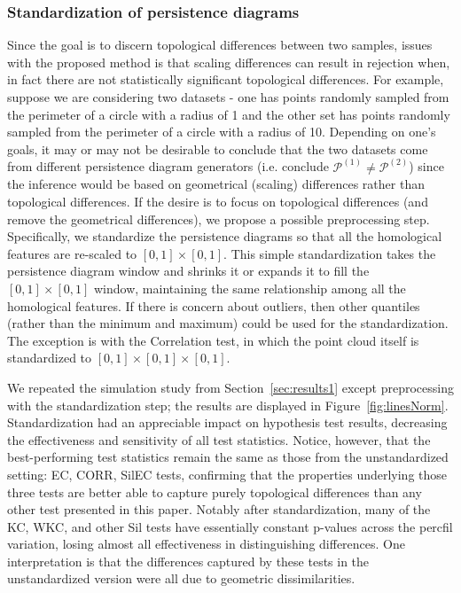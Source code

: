 \documentclass[12pt]{article}
\newcommand{\figref}[1]{Figure~\ref{#1}}
\begin{document}
\subsubsection{Standardization of persistence diagrams} \label{sec:standardize}
Since the goal is to discern topological differences between two samples, issues with the proposed method is that scaling differences can result in rejection when, in fact there are not statistically significant topological differences. For example, suppose we are considering two datasets - one has points randomly sampled from the perimeter of a circle with a radius of 1 and the other set has points randomly sampled from the perimeter of a circle with a radius of 10.  Depending on one's goals, it may or may not be desirable to conclude that the two datasets come from different persistence diagram generators (i.e. conclude $\mathcal P^{(1)} \neq \mathcal P^{(2)}$) since the inference would be based on geometrical (scaling) differences rather than topological differences.  If the desire is to focus on topological differences (and remove the geometrical differences), we propose a possible preprocessing step. Specifically, we standardize the persistence diagrams so that all the homological features are re-scaled to $[0, 1]\times[0,1]$. This simple standardization takes the persistence diagram window and shrinks it or expands it to fill the $[0, 1]\times[0,1]$ window, maintaining the same relationship among all the homological features.  If there is concern about outliers, then other quantiles (rather than the minimum and maximum) could be used for the standardization. The exception is with the Correlation test, in which the point cloud itself is standardized to $[0, 1]\times[0, 1]\times[0, 1]$.

We repeated the simulation study from Section~\ref{sec:results1} except preprocessing with the standardization step; the results are displayed in \figref{fig:linesNorm}. Standardization had an appreciable impact on hypothesis test results, decreasing the effectiveness and sensitivity of all test statistics. Notice, however, that the best-performing test statistics remain the same as those from the unstandardized setting: EC, CORR, SilEC tests, confirming that the properties underlying those three tests are better able to capture purely topological differences than any other test presented in this paper. Notably after standardization, many of the KC, WKC, and other Sil tests have essentially constant p-values across the percfil variation, losing almost all effectiveness in distinguishing differences. One interpretation is that the differences captured by these tests in the unstandardized version were all due to geometric dissimilarities.
\end{document}

